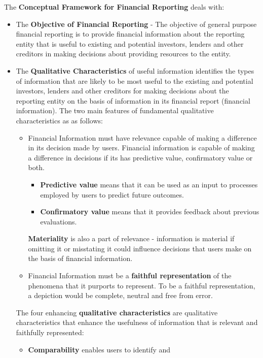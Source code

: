 \documentclass[../main.tex]{subfiles}
\begin{document}
	The \textbf{Conceptual Framework for Financial Reporting} deals with:
	\begin{itemize}[noitemsep]
		\item The \textbf{Objective of Financial Reporting} - The objective of 
		general purpose financial reporting is to provide financial information 
		about the reporting entity that is useful to existing and potential 
		investors, lenders and other creditors in making decisions about 
		providing resources to the entity. 
		\item The \textbf{Qualitative Characteristics} of useful information 
		identifies the types of information that are likely to be most useful 
		to the existing and potential investors, lenders and other creditors 
		for making decisions about the reporting entity on the basis of 
		information in its financial report (financial information). 
		The two main features of fundamental qualitative characteristics as 
		as follows:
		\begin{itemize}[noitemsep]
			\item Financial Information must have relevance \ie capable of 
			making a difference in its decision made by users. Financial 
			information is capable of making a difference in decisions if its 
			has predictive value, confirmatory value or both. 
			\begin{itemize}[noitemsep]
				\item \textbf{Predictive value} means that it can be used as an 
				input to processes employed by users to predict future 
				outcomes. 
				\item \textbf{Confirmatory value} means that it provides 
				feedback about previous evaluations.
			\end{itemize} \textbf{Materiality} is also a part of relevance - 
			information is material if omitting it or misstating it could 
			influence decisions that users make on the basis of financial 
			information. 
			\item Financial Information must be a \textbf{faithful 
			representation} of the phenomena that it purports to represent. To 
			be a faithful representation, a depiction would be complete, 
			neutral and free from error. 
		\end{itemize}
		The four enhancing \textbf{qualitative characteristics} are qualitative 
		characteristics that enhance the usefulness of information that is 
		relevant and faithfully represented:
		\begin{itemize}[noitemsep]
			\item \textbf{Comparability} enables users to identify and 

\end{itemize}
\end{itemize}
\end{document}
